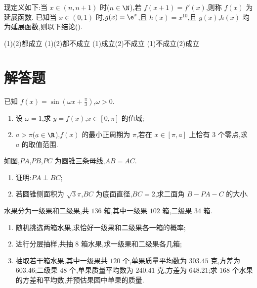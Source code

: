 \begin{problem}
现定义如下:当 \(x\in(n,n+1)\) 时(\(n\in \N\)),若 \(f(x+1)=f'(x)\),则称 \(f(x)\) 为延展函数. 已知当 \(x\in(0,1)\) 时,\(g(x)=\e^x\),且 \(h(x)=x^{10}\),且 \(g(x)\),\(h(x)\) 均为延展函数,则以下结论(\quad).

\choices
    {(1)(2)都成立}
    {(1)(2)都不成立}
    {(1)成立(2)不成立}
    {(1)不成立(2)成立}
\end{problem}

\section{解答题}

\begin{problem}
已知 \(f(x)=\sin\left(\omega x+\frac{\pi}{3}\right)\),\(\omega>0\).

\begin{enumerate}
\item 设 \(\omega=1\),求 \(y=f(x)\),\(x\in[0,\pi]\) 的值域;
\item \(a>\pi\)(\(a\in\R\)),\(f(x)\) 的最小正周期为 \(\pi\),若在 \(x\in[\pi,a]\) 上恰有 \(3\) 个零点,求 \(a\) 的取值范围.
\end{enumerate}
\end{problem}

\begin{problem}
如图,\(PA\),\(PB\),\(PC\) 为圆锥三条母线,\(AB=AC\).

\begin{enumerate}
\item 证明:\(PA\perp BC\);
\item 若圆锥侧面积为 \(\sqrt3\pi\),\(BC\) 为底面直径,\(BC=2\),求二面角 \(B-PA-C\) 的大小.
\end{enumerate}

\end{problem}

\begin{problem}
水果分为一级果和二级果,共 \(136\) 箱,其中一级果 \(102\) 箱,二级果 \(34\) 箱.

\begin{enumerate}
\item 随机挑选两箱水果,求恰好一级果和二级果各一箱的概率;
\item 进行分层抽样,共抽 \(8\) 箱水果,求一级果和二级果各几箱;
\item 抽取若干箱水果,其中一级果共 \(120\) 个,单果质量平均数为 \(303.45\) 克,方差为 \(603.46\);二级果 \(48\) 个,单果质量平均数为 \(240.41\) 克,方差为 \(648.21\);求 \(168\) 个水果的方差和平均数,并预估果园中单果的质量.
\end{enumerate}
\end{problem}

